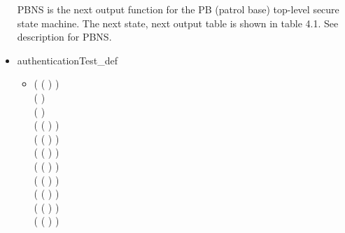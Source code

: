 \begin{itemize}
\begin{itemize}
 \end{itemize}
 PBNS is the next output function for the PB (patrol base) top-level secure state
 machine. The next state, next output table is shown in table 4.1. See description for PBNS.
\item authenticationTest_def
  \begin{itemize}
    \item[] \HOLTokenTurnstile{} ( (    ) \HOLSymConst{\HOLTokenEquiv{}} ) \HOLSymConst{\HOLTokenConj{}}\ \\
   (  \HOLSymConst{\HOLTokenEquiv{}} ) \HOLSymConst{\HOLTokenConj{}}\\ (  \HOLSymConst{\HOLTokenEquiv{}} ) \HOLSymConst{\HOLTokenConj{}}\ \\
   ( ( ) \HOLSymConst{\HOLTokenEquiv{}} ) \HOLSymConst{\HOLTokenConj{}}\ \\
   ( ( ) \HOLSymConst{\HOLTokenEquiv{}} ) \HOLSymConst{\HOLTokenConj{}}\ \\
   ( (  ) \HOLSymConst{\HOLTokenEquiv{}} ) \HOLSymConst{\HOLTokenConj{}}\ \\
   ( (  ) \HOLSymConst{\HOLTokenEquiv{}} ) \HOLSymConst{\HOLTokenConj{}}\ \\
   ( (  ) \HOLSymConst{\HOLTokenEquiv{}} ) \HOLSymConst{\HOLTokenConj{}}\ \\
   ( (  ) \HOLSymConst{\HOLTokenEquiv{}} ) \HOLSymConst{\HOLTokenConj{}}\ \\
   ( (  ) \HOLSymConst{\HOLTokenEquiv{}} ) \HOLSymConst{\HOLTokenConj{}}\ \\
   ( (  ) \HOLSymConst{\HOLTokenEquiv{}} ) \HOLSymConst{\HOLTokenConj{}}\\

\end{itemize}
\end{itemize}
